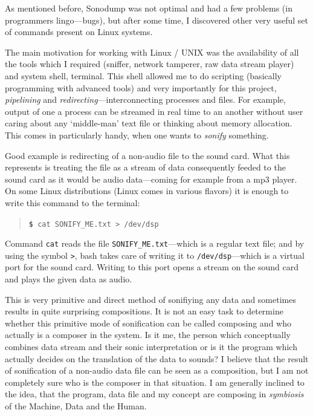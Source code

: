 \documentclass[12pt,a4paper,oneside]{report}
\begin{document}
As mentioned before, Sonodump was not optimal and had a few problems (in programmers lingo---bugs), but after some time, I discovered other very useful set of commands present on Linux systems.

The main motivation for working with Linux / UNIX was the availability of all the tools which I required (sniffer, network tamperer, raw data stream player) and system shell, terminal. This shell allowed me to do scripting (basically programming with advanced tools) and very importantly for this project, \emph{pipelining} and \emph{redirecting}---interconnecting processes and files. For example, output of one a process can be streamed in real time to an another without user caring about any `middle-man' text file or thinking about memory allocation. This comes in particularly handy, when one wants to \emph{sonify} something. 

Good example is redirecting of a non-audio file to the sound card. What this represents is treating the file as a stream of data consequently feeded to the sound card as it would be audio data---coming for example from a mp3 player. On some Linux distributions (Linux comes in various flavors) it is enough to write this command to the terminal:
\begin{quotation}
	\texttt{\textbf{\$} cat SONIFY\_ME.txt > /dev/dsp} 
\end{quotation}

Command \texttt{cat} reads the file \texttt{SONIFY\_ME.txt}---which is a regular text file; and by using the symbol \texttt{>}, bash takes care of writing it to \texttt{/dev/dsp}---which is a virtual port for the sound card. Writing to this port opens a stream on the sound card and plays the given data as audio.

This is very primitive and direct method of sonifiying any data and sometimes results in quite surprising compositions. It is not an easy task to determine whether this primitive mode of sonification can be called composing and who actually is a composer in the system. Is it me, the person which conceptually combines data stream and their sonic interpretation or is it the program which actually decides on the translation of the data to sounds? I believe that the result of sonification of a non-audio data file can be seen as a composition, but I am not completely sure who is the composer in that situation. I am generally inclined to the idea, that the program, data file and my concept are composing in \emph{symbiosis} of the Machine, Data and the Human.
\end{document}
